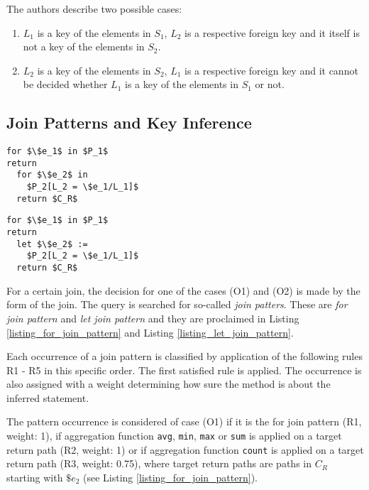 The authors describe two possible cases:

\begin{enumerate}
\renewcommand{\theenumi}{(O\arabic{enumi})}
\renewcommand{\labelenumi}{\theenumi}
\item $L_1$ is a key of the elements in $S_1$, $L_2$ is a respective foreign key and it itself is not a key of the elements in $S_2$.
\item $L_2$ is a key of the elements in $S_2$, $L_1$ is a respective foreign key and it cannot be decided whether $L_1$ is a key of the elements in $S_1$ or not.
\end{enumerate}

\subsection{Join Patterns and Key Inference}
\begin{lstlisting}[mathescape, float, caption=For join pattern., frame=single, label=listing_for_join_pattern]
for $\$e_1$ in $P_1$
return
  for $\$e_2$ in
    $P_2[L_2 = \$e_1/L_1]$
  return $C_R$
\end{lstlisting}

\begin{lstlisting}[mathescape, float, caption=Let join pattern., frame=single, label=listing_let_join_pattern]
for $\$e_1$ in $P_1$
return
  let $\$e_2$ :=
    $P_2[L_2 = \$e_1/L_1]$
  return $C_R$
\end{lstlisting}

For a certain join, the decision for one of the cases (O1) and (O2) is made by the form of the join. The query is searched for so-called \emph{join patters}. These are \emph{for join pattern} and \emph{let join pattern} and they are proclaimed in Listing \ref{listing_for_join_pattern} and Listing \ref{listing_let_join_pattern}.

Each occurrence of a join pattern is classified by application of the following rules R1 - R5 in this specific order. The first satisfied rule is applied. The occurrence is also assigned with a weight determining how sure the method is about the inferred statement.

The pattern occurrence is considered of case (O1) if it is the for join pattern (R1, weight: 1), if aggregation function \texttt{avg}, \texttt{min}, \texttt{max} or \texttt{sum} is applied on a target return path (R2, weight: 1) or if aggregation function \texttt{count} is applied on a target return path (R3, weight: 0.75), where target return paths are paths in $C_R$ starting with $\$e_2$ (see Listing \ref{listing_for_join_pattern}).

